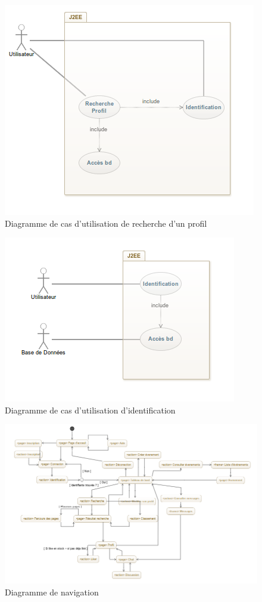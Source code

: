 \begin{figure}[ht!]
  \centering
   \caption{Diagramme de cas d'utilisation de recherche d'un profil}
   \includegraphics[scale=0.6]{cuRP}
\end{figure}

\begin{figure}[ht!]
  \centering
   \caption{Diagramme de cas d'utilisation d'identification}
   \includegraphics[scale=0.6]{cuId}
\end{figure}

\newpage

  \begin{figure}[ht!]
    \centering
    \caption{Diagramme de navigation}
    \includegraphics[scale=0.4]{dNav}
  \end{figure}
